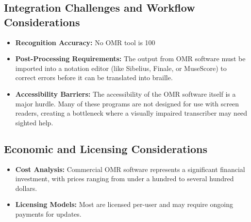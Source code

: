 \subsection{Integration Challenges and Workflow Considerations}\label{ch10:ssec:omr-integration-challenges}
\begin{itemize}
	\item \textbf{Recognition Accuracy:} No \gls{OMR} tool is 100%
	\item \textbf{Post-Processing Requirements:} The output from \gls{OMR} software must be imported into a notation editor (like Sibelius, Finale, or MuseScore) to correct errors before it can be translated into braille.
	\item \textbf{Accessibility Barriers:} The accessibility of the \gls{OMR} software itself is a major hurdle. Many of these programs are not designed for use with screen readers, creating a bottleneck where a visually impaired transcriber may need sighted help.
\end{itemize}

\subsection{Economic and Licensing Considerations}\label{ch10:ssec:omr-economic-licensing}
\begin{itemize}
	\item \textbf{Cost Analysis:} Commercial \gls{OMR} software represents a significant financial investment, with prices ranging from under a hundred to several hundred dollars.
	\item \textbf{Licensing Models:} Most are licensed per-user and may require ongoing payments for updates.
\end{itemize}

